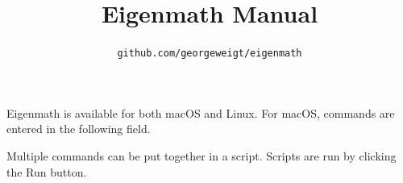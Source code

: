 \documentclass[12pt]{article}
\title{Eigenmath Manual}
\author{\tt github.com/georgeweigt/eigenmath}
\begin{document}
\maketitle
\tableofcontents

\bigskip

Eigenmath is available for both macOS and Linux.
For macOS, commands are entered in the following field.

\begin{center}
\end{center}

Multiple commands can be put together in a script.
Scripts are run by clicking the Run button.

\begin{center}
\end{center}
\end{document}
